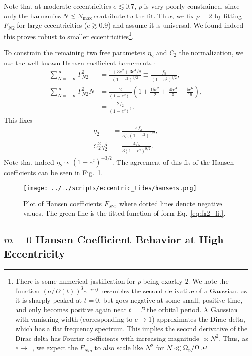 \documentclass[
        fleqn,
        usenatbib,
        referee,
    ]{mnras}
\newcommand*{\p}[1]{\left(#1\right)}
\begin{document}
Note that at moderate eccentricities $e \lesssim 0.7$, $p$ is very poorly
constrained, since only the harmonics $N \lesssim N_{\max}$ contribute to the
fit. Thus, we fix $p = 2$ by fitting $F_{N2}$ for large eccentricities ($e
\gtrsim 0.9$) and assume it is universal. We found indeed this proves robust to
smaller eccentricities\footnote{There is some numerical justification for $p$
being exactly $2$. We note the function $\p{a/D(t)}^3e^{-imf}$ resembles the
second derivative of a Gaussian: as it is sharply peaked at $t = 0$, but goes
negative at some small, positive time, and only becomes positive again near $t =
P$ the orbital period. A Gaussian with vanishing width (corresponding to $e \to
1$) approximates the Dirac delta, which has a flat frequency spectrum. This
implies the second derivative of the Dirac delta has Fourier coefficients with
increasing magnitude $\propto N^2$. Thus, as $e \to 1$, we expect the $F_{Nm}$
to also scale like $N^2$ for $N \ll \Omega_{\rm p} / \Omega$.}.

To constrain the remaining two free parameters $\eta_2$ and $C_2$ the
normalization, we use the well known Hansen coefficient homements
\citep{hut,sl,vlf}:
\begin{align}
    \sum\limits_{N = -\infty}^\infty F_{N2}^2
        &= \frac{1 + 3e^2 + 3e^4/8}{\p{1 - e^2}^{9/2}}
            \equiv \frac{f_5}{\p{1 - e^2}^{9/2}},\\
    \sum\limits_{N = -\infty}^\infty F_{N2}^2N
        &= \frac{2}{\p{1 - e^2}^6}\p{1 + \frac{15e^2}{2}
            + \frac{45 e^4}{8} + \frac{5e^6}{16}},\\
        &= \frac{2f_2}{\p{1 - e^2}^6}.
\end{align}
This fixes
\begin{align}
    \eta_2 &= \frac{4f_2}{5f_5\p{1 - e^2}^{3/2}},\\
    C_2^2\eta_2^5 &= \frac{4f_5}{3\p{1 - e^2}^{9/2}}.
\end{align}
Note that indeed $\eta_2 \propto \p{1 - e^2}^{-3/2}$. The agreement of this fit
of the Hansen coefficients can be seen in Fig.~\ref{fig:hansens}.
\begin{figure}
    \centering
    \texttt{[image: ../../scripts/eccentric\_tides/hansens.png]}
    \caption{Plot of Hansen coefficients $F_{N2}$, where dotted lines denote
    negative values. The green line is the fitted function of form
    Eq.~\eqref{eq:fn2_fit}.}\label{fig:hansens}
\end{figure}

\subsection{$m = 0$ Hansen Coefficient Behavior at High Eccentricity}
\end{document}
